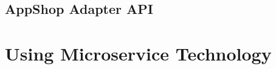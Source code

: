 \subsection{AppShop Adapter API}\label{AdapterApi}
 
 
 
 
 
 
 
 
 
 
 
 
 
 
 
 
 
 
 
 
 
 
 
 \section{Using Microservice Technology}\label{MicroserviceImplementation}